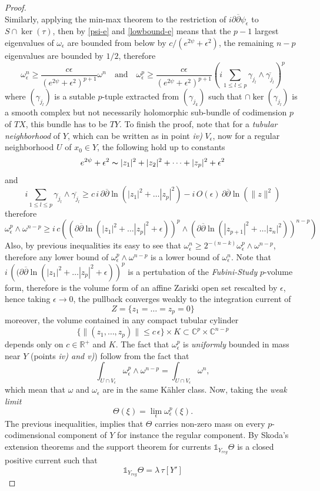 \documentclass[12pt,twoside,a4paper]{report}
\newcommand{\re}{\ensuremath{\mathbb R }}
\newcommand{\co}{\ensuremath{\mathbb C }}
\begin{document}
\begin{proof}
\[  \]
  Similarly, applying the min-max theorem to the restriction of $i\partial\overline{\partial}\psi_{\epsilon}$ to $S\cap\ker(\tau)$, then by \ref{psi-e} and \ref{lowbound-e} means that the $p-1$ largest eigenvalues of $\omega_{\epsilon}$ are bounded from below by $c/(e^{2\psi}+\epsilon^2)$, the remaining $n-p$ eigenvalues are bounded by $1/2$, therefore
  \[
    \omega^n_{\epsilon}\geq \frac{c\epsilon}{(e^{2\psi}+\epsilon^2)^{p+1}}\omega^n\quad\text{and}\quad\omega^p_{\epsilon}\geq \frac{c\epsilon}{(e^{2\psi}+\epsilon^2)^{p+1}}\left(i\sum_{1\leq l\leq p}\gamma_{j_l}\wedge\overline{\gamma_{j_l}} \right)^p
  \]
  where $(\gamma_{j_l})$ is a sutable $p$-tuple extracted from $(\gamma_{j_k})$ such that $\cap\ker(\gamma_{j_l})$ is a smooth complex but not necessarily holomorphic sub-bundle of codimension $p$ of $TX$, this bundle has to be $TY$. To finish the proof, note that for a \emph{tubular neighborhood} of $Y$, which can be written as in point \emph{iv)} $V_{\epsilon}$, now for a regular neighborhood $U$ of $x_0\in Y$, the following hold up to constants
  \[
    e^{2\psi}+\epsilon^2\thicksim |z_1|^2+|z_2|^2+\dots+|z_p|^2+\epsilon^2  
  \]
  and
  \[
    i\sum_{1\leq l\leq p}\gamma_{j_l}\wedge\overline{\gamma_{j_l}}\geq c\,i\,\partial\overline{\partial}\ln(|z_1|^2+\dots|z_p|^2)-i\,O(\epsilon)\,\partial\overline{\partial}\ln(\|z\|^2)
  \]
  therefore
  \[
    \omega^p_{\epsilon}\wedge\omega^{n-p}\geq i\,c\left((\partial\overline{\partial}\ln(|z_1|^2+\dots|z_p|^2+\epsilon))^p\wedge(\partial\overline{\partial}\ln(|z_{p+1}|^2+\dots|z_n|^2))^{n-p}\right)
  \]
  Also, by previous inequalities its easy to see that $\omega^n_{\epsilon}\geq 2^{-(n-k)}\omega^p_{\epsilon}\wedge\omega^{n-p}$, therefore any lower bound of $\omega_{\epsilon}^p\wedge\omega^{n-p}$ is a lower bound of $\omega^n_{\epsilon}$. Note that $i\,\left((\partial\overline{\partial}\ln(|z_1|^2+\dots|z_p|^2+\epsilon)\right)^p$ is a pertubation of the \emph{Fubini-Study} $p$-volume form, therefore is the volume form of an affine Zariski open set rescalted by $\epsilon$, hence taking $\epsilon\to 0$, the pullback converges weakly to the integration current of
  \[
    Z=\{z_1=\dots=z_p=0\}
  \]
  moreover, the volume contained in any compact tubular cylinder
  \[
    \{\|(z_1,\dots,z_p)\|\leq c\,\epsilon\}\times K\subset\co^{p}\times\co^{n-p}
  \]
  depends only on $c\in\re^{+}$ and $K$. The fact that $\omega_{\epsilon}^p$ is \emph{uniformly} bounded in mass near $Y$ (points \emph{iv) and v)}) follow from the fact that
  \[
    \int_{U\cap V_{\epsilon}}\omega_{\epsilon}^p\wedge\omega^{n-p}=\int_{U\cap V_{\epsilon}}\omega^n,
  \]
  which mean that $\omega$ and $\omega_{\epsilon}$ are in the same Kähler class. Now, taking the \emph{weak limit}
  \[
    \Theta(\xi)=\lim_{\epsilon}\omega^p_{\epsilon}(\xi).
  \]
  The previous inequalities, implies that $\Theta$ carries non-zero  mass on every $p$-codimensional component of $Y$ for instance the regular component. By Skoda's extension theorems and the support theorem for currents $\mathds{1}_{Y_{reg}}\Theta$ is a closed positive current such that
  \[
    \mathds{1}_{Y_{reg}}\Theta=\lambda\,\tau[Y']
  \]
  \end{proof}
\end{document}
